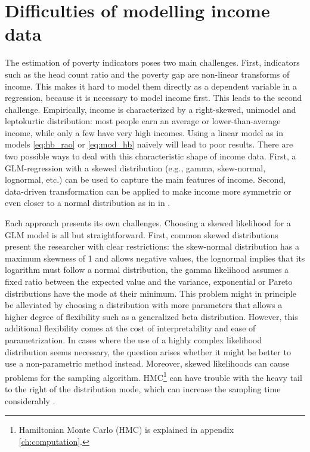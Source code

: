 \section{Difficulties of modelling income data}
\label{ch:difficulties}
The estimation of poverty indicators poses two main challenges.
First, indicators such as the head count ratio and the poverty gap are non-linear transforms of income.
This makes it hard to model them directly as a dependent variable in a regression, because it is necessary to model income first.
This leads to the second challenge.
Empirically, income is characterized by a right-skewed, unimodel and leptokurtic distribution:
most people earn an average or lower-than-average income, while only a few have very high incomes.
Using a linear model as in models \ref{eq:hb_rao} or \ref{eq:mod_hb} naively will lead to poor results.
There are two possible ways to deal with this characteristic shape of income data.
First, a GLM-regression with a skewed distribution (e.g., gamma, skew-normal, lognormal, etc.) can be used to capture the main features of income.
Second, data-driven transformation can be applied to make income more symmetric or even closer to a normal distribution as in in \cite{rojas_perilla_data_2020}.

Each approach presents its own challenges.
Choosing a skewed likelihood for a GLM model is all but straightforward.
First, common skewed distributions present the researcher with clear restrictions:
the skew-normal distribution has a maximum skewness of 1 and allows negative values, the lognormal implies that its logarithm must follow a normal distribution, the gamma likelihood assumes a fixed ratio between the expected value and the variance, exponential or Pareto distributions have the mode at their minimum.
This problem might in principle be alleviated by choosing a distribution with more parameters that allows a higher degree of flexibility such as a generalized beta distribution.
However, this additional flexibility comes at the cost of interpretability and ease of parametrization.
In cases where the use of a highly complex likelihood distribution seems necessary, the question arises whether it might be better to use a non-parametric method instead.
Moreover, skewed likelihoods can cause problems for the sampling algorithm. HMC\footnote{Hamiltonian Monte Carlo (HMC) is explained in appendix \ref{ch:computation}.} can have trouble with the heavy tail to the right of the distribution mode, which can increase the sampling time considerably \citep{betancourt_conceptual_2017}.

